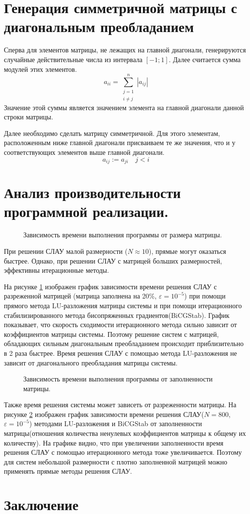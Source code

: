 \documentclass[a4paper, fontsize=14pt]{article}
\begin{document}
\section{Генерация симметричной матрицы с диагональным преобладанием}
Сперва для элементов матрицы, не лежащих на главной диагонали, генерируются случайные действительные
числа из интервала $[-1;1]$. Далее считается сумма модулей этих элементов. 
$$
    a_{ii} = \sum^{n}_{\substack{j=1\\ i \neq j}} |a_{ij}| 
$$
Значение этой суммы является значением элемента на главной диагонали данной строки матрицы. 

Далее необходимо сделать матрицу симметричной. Для этого элементам, расположенным ниже главной
диагонали присваиваем те же значения, что и у соответствующих элементов выше главной диагонали.
$$
    a_{ij} := a_{ji} \quad j<i
$$
\section{Анализ производительности программной реализации.}
\begin{figure}[h]
    \scriptsize
    \centering
    
    \caption{Зависимость времени выполнения программы от размера матрицы.}
    \label{fig:comp}
\end{figure}
При решении СЛАУ малой размерности ($N \approx 10$), прямые могут оказаться быстрее.
Однако, при решении СЛАУ с матрицей больших размерностей, эффективны итерационные методы. 

На рисунке \ref{fig:comp} изображен график зависимости времени решения СЛАУ с разреженной матрицей
(матрица заполнена на 20\%, $\varepsilon = 10^{-5}$) при помощи прямого метода LU-разложения
матрицы системы и при помощи итерационного стабилизированного метода бисопряженных
градиентов(BiCGStab). График показывает, что скорость
сходимости итерационного метода сильно зависит от коэффициентов матрицы системы. Поэтому решение
систем с матрицей, обладающих сильным диагональным преобладанием происходит приблизительно в 2 раза
быстрее. Время решения СЛАУ с помощью метода LU-разложения не зависит от диагонального преобладания
матрицы системы. 

\begin{figure}[H]
    \scriptsize
    \centering
    
    \caption{Зависимость времени выполнения программы от заполненности матрицы.}
    \label{fig:fill}
\end{figure}
Также время решения системы может зависеть от разреженности матрицы. На рисунке \ref{fig:fill}
изображен график зависимости времени решения СЛАУ($N=800$, $\varepsilon = 10^{-5}$) методами LU-разложения и BiCGStab от заполненности
матрицы(отношения количества ненулевых коэффициентов матрицы к общему их количеству). На графике
видно, что при увеличении заполненности время решения СЛАУ с помощью итерационного метода тоже
увеличивается. Поэтому для систем небольшой размерности с плотно заполненной матрицей можно
применять прямые методы решения СЛАУ.

\newpage

\section*{Заключение}

\newpage


\printbibliography
\end{document}
